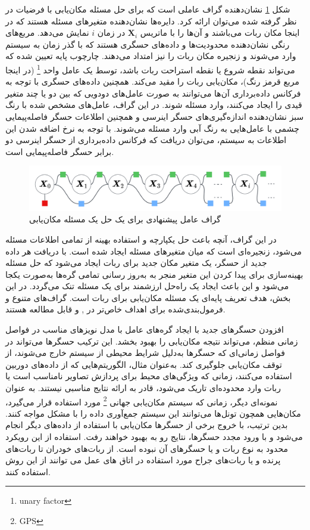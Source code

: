 شکل 
\ref{fig:localization}
نشان‌دهنده گراف عاملی است که برای حل مسئله مکان‌یابی با فرضیات در نظر گرفته شده می‌توان ارائه کرد. دایره‌ها نشان‌دهنده متغیرهای مسئله هستند که در اینجا مکان ربات می‌باشند و آن‌ها را با ماتریس
$\boldsymbol{X}_i$ 
در زمان $i$ نمایش می‌دهد. مربع‌های رنگی نشان‌دهنده محدودیت‌ها و داده‌های حسگری هستند که با گذر زمان به سیستم وارد می‌شوند و زنجیره مکان ربات را نیز امتداد می‌دهند. چارچوب پایه تعیین شده که می‌تواند نقطه شروع یا نقطه استراحت ربات باشد، توسط یک عامل واحد
\footnote{unary factor}
(در اینجا مربع قرمز رنگ)، مکان‌یابی ربات را مقید می‌کند. همچنین داده‌های حسگری با توجه به فرکانس داده‌برداری آن‌ها می‌توانند به صورت عامل‌های دودویی که بین دو یا چند متغیر قیدی را ایجاد می‌کنند، وارد مسئله شوند. در این گراف، عامل‌های مشخص شده با رنگ سبز نشان‌دهنده اندازه‌گیری‌های حسگر اینرسی و همچنین اطلاعات حسگر فاصله‌پیمایی چشمی با عامل‌هایی به رنگ آبی وارد مسئله می‌شوند. با توجه به نرخ اضافه شدن این اطلاعات به سیستم، می‌توان دریافت که فرکانس داده‌برداری از حسگر اینرسی دو برابر حسگر فاصله‌پیمایی است. 
\begin{figure}
	\centering
	\includegraphics[width=0.7\linewidth]{img/Localization}
	\caption{گراف عامل پیشنهادی برای یک حل یک مسئله مکان‌یابی}
	\label{fig:localization}
\end{figure}

در این گراف، آنچه باعث حل یکپارچه و استفاده بهینه از تمامی اطلاعات مسئله می‌شود، زنجیره‌ای است که میان متغیرهای مسئله ایجاد شده است. با دریافت هر داده جدید از حسگر، یک متغیر مکان جدید برای ربات ایجاد می‌شود که حل مسئله بهینه‌سازی برای پیدا کردن این متغیر منجر به به‌روز رسانی تمامی گره‌ها به‌صورت یکجا می‌شود و این باعث ایجاد یک راه‌حل ارزشمند برای یک مسئله تنک می‌گردد. در این بخش، هدف تعریف پایه‌ای یک مسئله مکان‌یابی برای ربات است. گراف‌های متنوع و فرمول‌بندی‌شده برای اهداف خاص‌تر در
\cite{yang2022indoor}, 
\cite{song2021tightly}
و 
\cite{leitinger2017factor}
قابل مطالعه هستند. 

افزودن حسگرهای جدید با ایجاد گره‌های عامل با مدل نویزهای مناسب در فواصل زمانی منظم، می‌تواند نتیجه مکان‌یابی را بهبود بخشد. این ترکیب حسگرها می‌تواند در فواصل زمانی‌ای که حسگرها به‌دلیل شرایط محیطی از سیستم خارج می‌شوند، از توقف مکان‌یابی جلوگیری کند. به‌عنوان مثال، الگوریتم‌هایی که از داده‌های دوربین استفاده می‌کنند، زمانی که ویژگی‌های محیط برای پردازش تصاویر نامناسب است یا ربات وارد محدوده‌ای تاریک می‌شود، قادر به ارائه نتایج مناسبی نیستند. به عنوان نمونه‌ای دیگر، زمانی که سیستم مکان‌یابی جهانی
\footnote{GPS}
مورد استفاده قرار می‌گیرد، مکان‌هایی همچون تونل‌ها می‌توانند این سیستم جمع‌آوری داده را با مشکل مواجه کنند. بدین ترتیب، با خروج برخی از حسگرها مکان‌یابی با استفاده از داده‌های دیگر انجام می‌شود و با ورود مجدد حسگرها، نتایج رو به بهبود خواهند رفت. استفاده از این رویکرد محدود به نوع ربات و یا حسگرهای آن نبوده است.  
از ربات‌های خودران
\cite{wilbers2019localization}
تا ربات‌های پرنده
\cite{dai2022uav}
و یا ربات‌های جراح مورد استفاده در اتاق های عمل می توانند از این روش استفاده کنند. 


